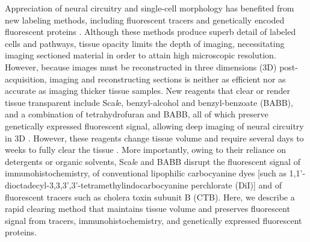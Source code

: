 Appreciation of neural circuitry and single-cell morphology has benefited from new labeling methods, including fluorescent tracers and genetically encoded fluorescent proteins \cite{luo2008genetic}.
Although these methods produce superb detail of labeled cells and pathways, tissue opacity limits the depth of imaging, necessitating imaging sectioned material in order to attain high microscopic resolution.
However, because images must be reconstructed in three dimensions (3D) post-acquisition, imaging and reconstructing sections is neither as efficient nor as accurate as imaging thicker tissue samples.
New reagents that clear or render tissue transparent include Sca\emph{l}e, benzyl-alcohol and benzyl-benzoate (BABB), and a combination of tetrahydrofuran and BABB, all of which preserve genetically expressed fluorescent signal, allowing deep imaging of neural circuitry in 3D \cite{dodt2007ultramicroscopy,hama2011scale,erturk2012three}.
However, these reagents change tissue volume and require several days to weeks to fully clear the tissue \cite{hama2011scale,erturk2012three}.
More importantly, owing to their reliance on detergents or organic solvents, Sca\emph{l}e and BABB disrupt the fluorescent signal of immunohistochemistry, of conventional lipophilic carbocyanine dyes [such as 1,1'-dioctadecyl-3,3,3',3'-tetramethylindocarbocyanine perchlorate (DiI)] and of fluorescent tracers such as cholera toxin subunit B (CTB).
Here, we describe a rapid clearing method that maintains tissue volume and preserves fluorescent signal from tracers, immunohistochemistry, and genetically expressed fluorescent proteins.